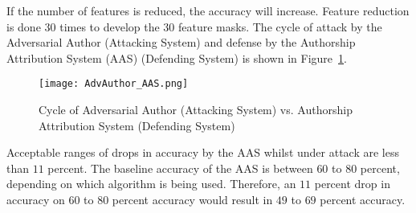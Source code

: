 \documentclass[conference]{IEEEtran}
\begin{document}
If the number of features is reduced, the accuracy will increase. Feature reduction is done \begin{math}30\end{math} times to develop the \begin{math}30\end{math} feature masks. The cycle of attack by the Adversarial Author (Attacking System) and defense by the Authorship Attribution System (AAS) (Defending System) is shown in Figure~\ref{figure_AdvAuthor_AAS}. 

 \begin{figure}%
 \begin{center}
 \setlength{\unitlength}{0.012500in}
 \texttt{[image: AdvAuthor\_AAS.png]}
 \end{center}
 \caption{Cycle of Adversarial Author (Attacking System) vs. Authorship Attribution System (Defending System)}
 \label{figure_AdvAuthor_AAS}
 \end{figure}

Acceptable ranges of drops in accuracy by the AAS whilst under attack are less than \begin{math}11\end{math} percent. The baseline accuracy of the AAS is between \begin{math}60\end{math} to \begin{math}80\end{math} percent, depending on which algorithm is being used. Therefore, an \begin{math}11\end{math} percent drop in accuracy on \begin{math}60\end{math} to \begin{math}80\end{math} percent accuracy would result in \begin{math}49\end{math} to \begin{math}69\end{math} percent accuracy. %
\end{document}
